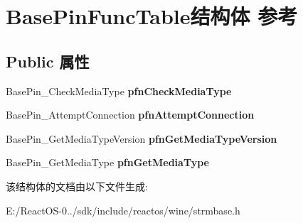 \hypertarget{struct_base_pin_func_table}{}\section{Base\+Pin\+Func\+Table结构体 参考}
\label{struct_base_pin_func_table}
\subsection*{Public 属性}
\begin{DoxyCompactItemize}
\item 
\mbox{\label{struct_base_pin_func_table_abd8fe934d66436db53b9ab5aae935cd7}} 
Base\+Pin\+\_\+\+Check\+Media\+Type {\bfseries pfn\+Check\+Media\+Type}
\item 
\mbox{\label{struct_base_pin_func_table_a95d5fe60127f9cb9f9e9cb84115bb092}} 
Base\+Pin\+\_\+\+Attempt\+Connection {\bfseries pfn\+Attempt\+Connection}
\item 
\mbox{\label{struct_base_pin_func_table_a531afa80d6de50a4d07503b98a4b0070}} 
Base\+Pin\+\_\+\+Get\+Media\+Type\+Version {\bfseries pfn\+Get\+Media\+Type\+Version}
\item 
\mbox{\label{struct_base_pin_func_table_a30527c150cac7bcd79b1cca6d2a6afcc}} 
Base\+Pin\+\_\+\+Get\+Media\+Type {\bfseries pfn\+Get\+Media\+Type}
\end{DoxyCompactItemize}


该结构体的文档由以下文件生成\+:\begin{DoxyCompactItemize}
\item 
E\+:/\+React\+O\+S-\/0../sdk/include/reactos/wine/strmbase.\+h\end{DoxyCompactItemize}
